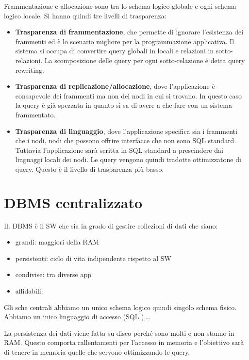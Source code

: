 Frammentazione e allocazione sono tra lo schema logico globale e ogni schema
logico locale. Si hanno quindi tre livelli di trasparenza:
\begin{itemize}
    \item \textbf{Trasparenza di frammentazione}, che permette di ignorare
          l'esistenza dei frammenti ed è lo scenario migliore per la
          programmazione applicativa. Il sistema si occupa di convertire query
          globali in locali e relazioni in sotto-relazioni. La scomposizione
          delle query per ogni sotto-relazione è detta query rewriting.
    \item \textbf{Trasparenza di replicazione/allocazione}, dove l'applicazione
          è consapevole dei frammenti ma non dei nodi in cui si trovano. In questo
          caso la query è già spezzata in quanto si sa di avere a che fare con un
          sistema frammentato.
    \item \textbf{Trasparenza di linguaggio}, dove l'applicazione specifica
          sia i frammenti che i nodi, nodi che possono offrire interfacce che
          non sono SQL standard. Tuttavia l'applicazione sarà scritta in SQL
          standard a prescindere dai linguaggi locali dei nodi. Le query
          vengono quindi tradotte ottimizzatone di query. Questo è il livello
          di trasparenza più basso.
\end{itemize}



\section{DBMS centralizzato}
Il. DBMS è il SW che sia in grado di gestire collezioni di dati che siano:
\begin{itemize}
    \item grandi: maggiori della RAM
    \item persistenti: ciclo di vita indipendente rispetto al SW
    \item condivise: tra diverse app
    \item affidabili:
\end{itemize}

Gli sche centrali abbiamo un unico schema logico quindi singolo schema fisico.
Abbiamo un inico linguaggio di accesso (SQL )\dots.

La persistenza dei dati viene fatta su disco perché sono molti e non stanno in RAM.
Questo comporta rallentamenti per l'accesso in memoria e l'obiettivo sarà di tenere
in memoria quelle che servono ottimizzando le query.

